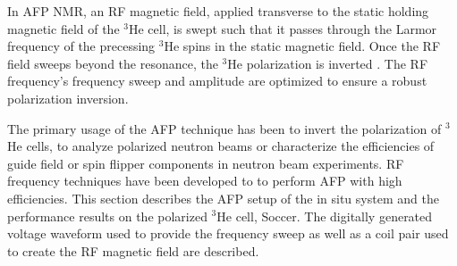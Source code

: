 In AFP NMR, an RF magnetic field, applied transverse to the static holding magnetic field of the $^3$He cell, is swept such that it passes through the Larmor frequency of the precessing $^3$He spins in the static magnetic field. Once the RF field sweeps beyond the resonance, the $^3$He polarization is inverted \cite{Abragam1961, Slichter1996}. The RF frequency's frequency sweep and amplitude are optimized to ensure a robust polarization inversion. 



The primary usage of the AFP technique has been to invert the polarization of $^3$He cells, to analyze polarized neutron beams or characterize the efficiencies of guide field or spin flipper components in neutron beam experiments. RF frequency techniques have been developed to to perform AFP with high efficiencies. This section describes the AFP setup of the in situ system and the performance results on the polarized $^3$He cell, Soccer. The digitally generated voltage waveform used to provide the frequency sweep as well as a coil pair used to create the RF magnetic field are described. 

